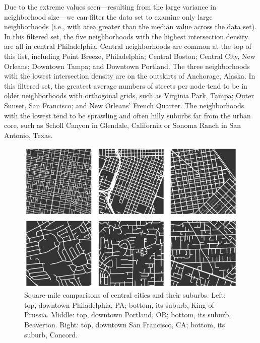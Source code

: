 \documentclass{article}
\begin{document}
Due to the extreme values seen---resulting from the large variance in neighborhood size---we can filter the data set to examine only large neighborhoods (i.e., with area greater than the median value across the data set). In this filtered set, the five neighborhoods with the highest intersection density are all in central Philadelphia. Central neighborhoods are common at the top of this list, including Point Breeze, Philadelphia; Central Boston; Central City, New Orleans; Downtown Tampa; and Downtown Portland. The three neighborhoods with the lowest intersection density are on the outskirts of Anchorage, Alaska. In this filtered set, the greatest average numbers of streets per node tend to be in older neighborhoods with orthogonal grids, such as Virginia Park, Tampa; Outer Sunset, San Francisco; and New Orleans' French Quarter. The neighborhoods with the lowest tend to be sprawling and often hilly suburbs far from the urban core, such as Scholl Canyon in Glendale, California or Sonoma Ranch in San Antonio, Texas.

\begin{figure}
	\includegraphics[width=1\textwidth]{media/fig05.png}
	\caption{Square-mile comparisons of central cities and their suburbs. Left: top, downtown Philadelphia, PA; bottom, its suburb, King of Prussia. Middle: top, downtown Portland, OR; bottom, its suburb, Beaverton. Right: top, downtown San Francisco, CA; bottom, its suburb, Concord.}
	\label{fig05}
\end{figure}
\end{document}
